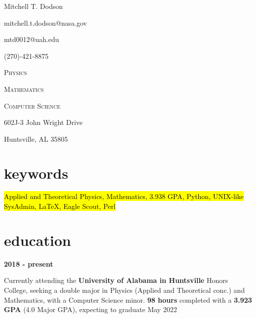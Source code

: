 \documentclass[9pt]{article}
\newcommand{\entry}[2]{
	\begin{minipage}[c]{.14\textwidth}
		{\small\textbf{#1}}\hfill
	\end{minipage}
	{\color{OliveGreen}\hfill \vline \hfill}
	\begin{minipage}[c]{.8\textwidth}
		#2
	\end{minipage}\vspace{.12in}
	}
\begin{document}
\begin{center}
	{\color{OliveGreen}\Huge{Mitchell T. Dodson}}

	\vspace{1em}

	\begin{minipage}[t]{.33\textwidth}

		mitchell.t.dodson@nasa.gov

		mtd0012@uah.edu

		(270)-421-8875

	\end{minipage}
	\begin{minipage}[t]{.20\textwidth}\begin{centering}

		\textsc{Physics}

		\textsc{Mathematics}

		\textsc{Computer Science}


	\end{centering}\end{minipage}
	\begin{minipage}[t]{.33\textwidth}

		\hfill
		602J-3 John Wright Drive

		\hfill
		Huntsville, AL 35805

	\end{minipage}
\end{center}

\section{keywords}
\textit{}
\begin{centering}

\hl{Applied and Theoretical Physics, Mathematics, 3.938 GPA, Python, UNIX-like SysAdmin, LaTeX, Eagle Scout, Perl}

\end{centering}
\section{education}
\textit{}

	\entry{2018 - present}{Currently attending the \textbf{University of Alabama in Huntsville} Honors College, seeking a double major in Physics (Applied and Theoretical conc.) and Mathematics, with a Computer Science minor. \textbf{98 hours} completed with a \textbf{3.923 GPA} (4.0 Major GPA), expecting to graduate May 2022}
\end{document}
